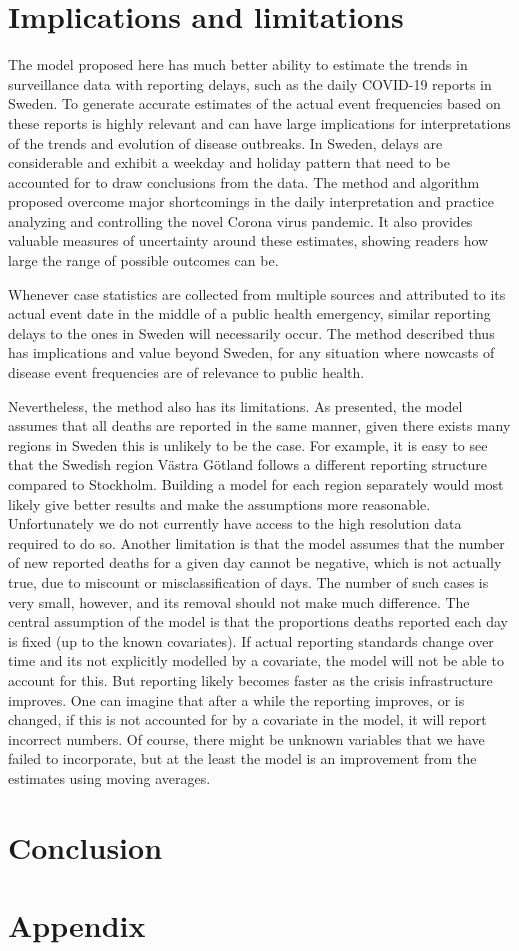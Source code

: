 \documentclass[a4paper,11pt,article,oneside,openany,american]{memoir}
\begin{document}
\chapter{Implications and limitations}
The model proposed here has much better ability to estimate the trends in surveillance data with reporting delays, such as the daily COVID-19 reports in Sweden. To generate accurate estimates of the actual event frequencies based on these reports is highly relevant and can have large implications for interpretations of the trends and evolution of disease outbreaks. In Sweden, delays are considerable and exhibit a weekday and holiday pattern that need to be accounted for to draw conclusions from the data. The method and algorithm proposed overcome major shortcomings in the daily interpretation and practice analyzing and controlling the novel Corona virus pandemic. It also provides valuable measures of uncertainty around these estimates, showing readers how large the range of possible outcomes can be.

Whenever case statistics are collected from multiple sources and attributed to its actual event date in the middle of a public health emergency, similar reporting delays to the ones in Sweden will necessarily occur. The method described thus has implications and value beyond Sweden, for any situation where nowcasts of disease event frequencies are of relevance to public health.

Nevertheless, the method also has its limitations. As presented, the model assumes that all deaths are reported in the same manner, given there exists many regions in Sweden this is unlikely to be the case. For example, it is easy to see that the Swedish region Västra Götland follows a different reporting structure compared to Stockholm. Building a model for each region separately would most likely give better results and make the assumptions more reasonable. Unfortunately we do not currently have access to the high resolution data required to do so. Another limitation is that the model assumes that the number of new reported deaths for a given day cannot be negative, which is not actually true, due to miscount or misclassification of days. The number of such cases is very small, however, and its removal should not make much difference. The central assumption of the model is that the proportions deaths reported each day is fixed (up to the known covariates). If actual reporting standards change over time and its not explicitly modelled by a covariate, the model will not be able to account for this. But reporting likely becomes faster as the crisis infrastructure improves. One can imagine that after a while the reporting improves, or is changed, if this is not accounted for by a covariate in the model, it will report incorrect numbers. Of course, there might be unknown variables that we have failed to incorporate, but at the least the model is an improvement from the estimates using moving averages.

\chapter{Conclusion}

\printbibliography%
\backmatter%
\appendix%
\chapter{Appendix}
%
\end{document}
